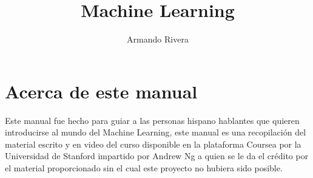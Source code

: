 \documentclass{report}
\author{Armando Rivera}
\title{Machine Learning}
\begin{document}
\maketitle
{}
\renewcommand{\tablename}{Tabla}
\renewcommand{\listtablename}{Índice de tablas}
\tableofcontents
\listoffigures
\listoftables
\chapter*{Acerca de este manual}
Este manual fue hecho para guiar a las personas hispano hablantes que quieren introducirse al mundo del Machine Learning, este manual es una recopilación del material escrito y en video del curso disponible en la plataforma Coursea por la Universidad de Stanford impartido por Andrew Ng a quien se le da el crédito por el material proporcionado sin el cual este proyecto no hubiera sido posible. 
\end{document}
